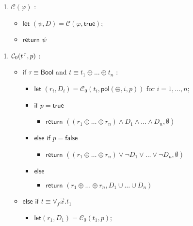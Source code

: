 \documentclass[runningheads,a4paper]{llncs}
\newcommand{\con}[1]{\mathsf{#1}}
\newcommand{\conv}{\mathcal{C}}
\newcommand{\ptrue}{\con{true}}
\newcommand{\pfalse}{\con{false}}
\newcommand{\pol}{\con{pol}}
\newcommand{\Bool}{\con{Bool}}
\newcommand{\boolop}{\oplus}
\newcommand{\forallf}[1]{\forall_{#1}}
\newcommand{\vthinspace}{\kern+0.083333em}
\newcommand{\typ}[1]{^{\vthinspace #1}}
\begin{document}
\begin{figure}[t]
\begin{enumerate}
\item[\ ] 
$\conv( \varphi )$ : 
 \begin{itemize}
   \item[] $\mathsf{let}$ $( \psi, D ) = \conv( \varphi, \ptrue )$;
   \item[] $\mathsf{return}$ $\psi$
  \end{itemize}
\end{enumerate}
\begin{enumerate}
\item[\ ] 
$\conv_0( t\typ{\tau}, p )$ : 
 \begin{itemize}
   \item[] $\mathsf{if}$ $\tau \equiv \Bool$ and $t \equiv t_1 \boolop \ldots \boolop t_n$ :
    \begin{itemize}
      \item[] $\mathsf{let}$ $( r_i, D_i ) = \conv_0( t_i, \pol( \boolop, i, p ) )$ for $i = 1, \ldots, n$;
      \item[] $\mathsf{if}$ $p = \ptrue$
      \begin{itemize}
        \item[] $\mathsf{return}$ $( ( r_1 \boolop \ldots \boolop r_n ) \wedge D_1 \wedge \ldots \wedge D_n, \emptyset )$
      \end{itemize}
      \item[] $\mathsf{else}$ $\mathsf{if}$ $p = \pfalse$
      \begin{itemize}
        \item[] $\mathsf{return}$ $( ( r_1 \boolop \ldots \boolop r_n ) \vee \neg D_1 \vee \ldots \vee \neg D_n, \emptyset )$
      \end{itemize}
      \item[] $\mathsf{else}$
      \begin{itemize}
        \item[] $\mathsf{return}$ $( r_1 \boolop \ldots \boolop r_n, D_1 \cup \ldots \cup D_n )$
      \end{itemize}
    \end{itemize}
  \item[] $\mathsf{else}$ $\mathsf{if}$ $t \equiv \forallf{f} \vec x. t_1$
    \begin{itemize}
      \item[] $\mathsf{let} ( r_1, D_1 ) = \conv_0( t_1, p )$;

\end{itemize}
\end{itemize}
\end{enumerate}
\end{figure}
\end{document}

